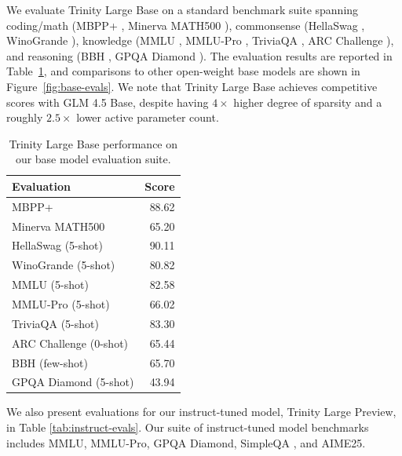 \documentclass{article}
\begin{document}
We evaluate Trinity Large Base on a standard benchmark suite spanning coding/math (MBPP+ \citep{liu2023codegeneratedchatgptreally}, Minerva MATH500 \citep{lewkowycz2022solvingquantitativereasoningproblems}), commonsense (HellaSwag \citep{zellers2019hellaswagmachinereallyfinish}, WinoGrande \citep{sakaguchi2019winograndeadversarialwinogradschema}), knowledge (MMLU \citep{hendrycks2021measuringmassivemultitasklanguage}, MMLU-Pro \citep{wang2024mmluprorobustchallengingmultitask}, TriviaQA \citep{joshi2017triviaqalargescaledistantly}, ARC Challenge \citep{clark2018thinksolvedquestionanswering}), and reasoning (BBH \citep{suzgun2022challengingbigbenchtaskschainofthought}, GPQA Diamond \citep{rein2023gpqagraduatelevelgoogleproofqa}). The evaluation results are reported in Table~\ref{tab:base-evals}, and comparisons to other open-weight base models are shown in Figure~\ref{fig:base-evals}. We note that Trinity Large Base achieves competitive scores with GLM 4.5 Base, despite having $4\times$ higher degree of sparsity and a roughly $2.5\times$ lower active parameter count.

\begin{table}[t]
\centering
\caption{Trinity Large Base performance on our base model evaluation suite.}
\label{tab:base-evals}
\begin{tabular}{l r}
\toprule
\textbf{Evaluation} & \textbf{Score} \\
\midrule
MBPP+ & 88.62 \\
Minerva MATH500 & 65.20 \\
HellaSwag (5-shot) & 90.11 \\
WinoGrande (5-shot) & 80.82 \\
MMLU (5-shot) & 82.58 \\
MMLU-Pro (5-shot) & 66.02 \\
TriviaQA (5-shot) & 83.30 \\
ARC Challenge (0-shot) & 65.44 \\
BBH (few-shot) & 65.70 \\
GPQA Diamond (5-shot) & 43.94 \\
\bottomrule
\end{tabular}
\end{table}

We also present evaluations for our instruct-tuned model, Trinity Large Preview, in Table \ref{tab:instruct-evals}. Our suite of instruct-tuned model benchmarks includes MMLU, MMLU-Pro, GPQA Diamond, SimpleQA \citep{wei2024measuringshortformfactualitylarge}, and AIME25.
\end{document}
